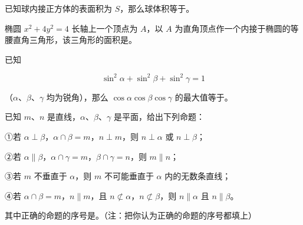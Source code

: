 \begin{question}
已知球内接正方体的表面积为 $S$，那么球体积等于\gkblank{}。

\end{question}
\begin{question}
椭圆 $x^2+4y^2=4$ 长轴上一个顶点为 $A$，以 $A$ 为直角顶点作一个内接于椭圆的等腰直角三角形，该三角形的面积是\gkblank{}。

\end{question}
\begin{question}
已知

\nopagebreak[4]
\[
\sin^2\alpha+\sin^2\beta+\sin^2\gamma=1
\]

（$\alpha\text{、}\beta\text{、}\gamma$ 均为锐角），那么 $\cos\alpha\cos\beta\cos\gamma$ 的最大值等于\gkblank{}。

\end{question}
\begin{question}
已知 $m\text{、}n$ 是直线，$\alpha\text{、}\beta\text{、}\gamma$ 是平面，给出下列命题：

①若 $\alpha\perp\beta$，$\alpha\cap\beta=m$，$n\perp m$，则 $n\perp\alpha$ 或 $n\perp\beta$；

②若 $\alpha\parallel\beta$，$\alpha\cap\gamma=m$，$\beta\cap\gamma=n$，则 $m\parallel n$；

③若 $m$ 不垂直于 $\alpha$，则 $m$ 不可能垂直于 $\alpha$ 内的无数条直线；

④若 $\alpha\cap\beta=m$，$n\parallel m$，且 $n\not\subset\alpha$，$n\not\subset\beta$，则 $n\parallel\alpha$ 且 $n\parallel\beta$。

其中正确的命题的序号是\gkblank{}。（注：把你认为正确的命题的序号都填上）

\end{question}

